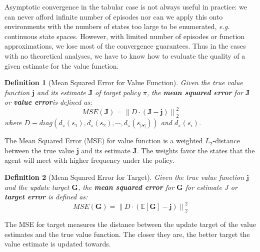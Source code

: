 \documentclass{article}
\newcommand\eg{\textit{e.g.}}
\newcommand\st{\textit{s.t.}}
\newcommand\doubleE{\mathbb{E}}
\newtheorem{theorem}{Theorem}[section]
\newtheorem{definition}{Definition}[section]
\begin{document}


Asymptotic convergence in the tabular case is not always useful in practice: we can never afford infinite number of episodes nor can we apply this onto environments with the numbers of states too large to be enumerated, \eg{} continuous state spaces. However, with limited number of episodes or function approximations, we lose most of the convergence guarantees. Thus in the cases with no theoretical analyses, we have to know how to evaluate the quality of a given estimate for the value function.

\begin{definition}[Mean Squared Error for Value Function]
Given the true value function $\bm{j}$ and its estimate $\bm{J}$ of target policy $\pi$, the \textbf{mean squared error} for $\bm{J}$ or \textbf{value error}is defined as:
$$MSE(\bm{J}) = {\| D \cdot (\bm{J} - \bm{j}) \|}_2^2$$
where $D \equiv diag(d_\pi(s_1), d_\pi(s_2), \cdots, d_\pi(s_{|S|}))$ and $d_\pi(s_i)$.
\end{definition}
\par
The Mean Squared Error (MSE) for value function is a weighted $L_2$-distance between the true value $\bm{j}$ and its estimate $\bm{J}$. The weights favor the states that the agent will meet with higher frequency under the policy.
\par
\begin{definition}[Mean Squared Error for Target]
Given the true value function $\bm{j}$ and the update target $\bm{G}$, the \textbf{mean squared error} for $\bm{G}$ for estimate $J$ or \textbf{target error} is defined as:
$$MSE(\bm{G}) = {\| D \cdot (\doubleE[\bm{G}] - \bm{j}) \|}_2^2$$
\end{definition}
\par
The MSE for target measures the distance between the update target of the value estimates and the true value function. The closer they are, the better target the value estimate is updated towards.
\end{document}
